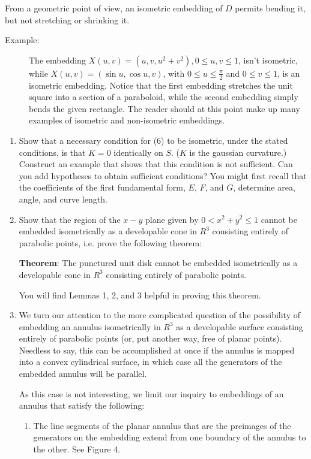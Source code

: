 \documentclass{book}
\begin{document}
From a geometric point of view, an isometric embedding of $D$ permits bending it, but not stretching or shrinking it.

\begin{description}
\item[Example:] The embedding $X(u,v) = (u, v, u^{2} + v^{2}), 0 \leq u, v \leq 1$, isn't isometric, while $X(u,v) = (\sin u, \cos u, v)$, with $0 \leq u \leq \frac{\pi}{2}$ and $0 \leq v \leq 1$, is an isometric embedding. Notice that the first embedding stretches the unit square into a section of a paraboloid, while the second embedding simply bends the given rectangle. The reader should at this point make up many examples of isometric and non-isometric embeddings.
\end{description}

\begin{enumerate}
  \item[19.] Show that a necessary condition for (6) to be isometric, under the stated conditions, is that $K = 0$ identically on $S$. ($K$ is the gaussian curvature.) Construct an example that shows that this condition is not sufficient. Can you add hypotheses to obtain sufficient conditions? You might first recall that the coefficients of the first fundamental form, $E$, $F$, and $G$, determine area, angle, and curve length.
  \item[20.] Show that the region of the $x-y$ plane given by $0 < x^{2} + y^{2} \leq 1$ cannot be embedded isometrically as a developable cone in $R^{3}$ consisting entirely of parabolic points, i.e. prove the following theorem:

     \textbf{Theorem}: The punctured unit disk cannot be embedded isometrically as a developable cone in $R^{3}$ consisting entirely of parabolic points.

     You will find Lemmas 1, 2, and 3 helpful in proving this theorem.
  \item[21.] We turn our attention to the more complicated question of the possibility of embedding an annulus isometrically in $R^{3}$ as a developable surface consisting entirely of parabolic points (or, put another way, free of planar points). Needless to say, this can be accomplished at once if the annulus is mapped into a convex cylindrical surface, in which case all the generators of the embedded annulus will be parallel.

     As this case is not interesting, we limit our inquiry to embeddings of an annulus that satisfy the following:
  \begin{enumerate}[\hspace{1cm}1)]
    \item The line segments of the planar annulus that are the preimages of the generators on the embedding extend from one boundary of the annulus to the other. See Figure 4.


\end{enumerate}
\end{enumerate}
\end{document}
